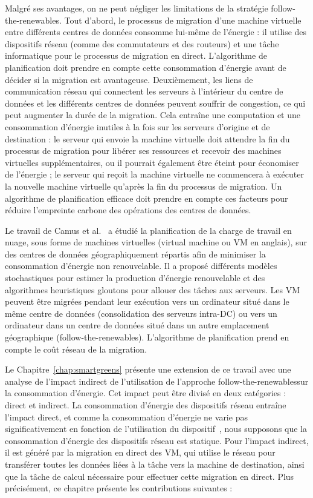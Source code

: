 Malgré ses avantages, on ne peut négliger les limitations de la stratégie follow-the-renewables. Tout d'abord, le processus de migration d'une machine virtuelle entre différents centres de données consomme lui-même de l'énergie : il utilise des dispositifs réseau (comme des commutateurs et des routeurs) et une tâche informatique pour le processus de migration en direct. L'algorithme de planification doit prendre en compte cette consommation d'énergie avant de décider si la migration est avantageuse. Deuxièmement, les liens de communication réseau qui connectent les serveurs à l'intérieur du centre de données et les différents centres de données peuvent souffrir de congestion, ce qui peut augmenter la durée de la migration. Cela entraîne une computation et une consommation d'énergie inutiles à la fois sur les serveurs d'origine et de destination : le serveur qui envoie la machine virtuelle doit attendre la fin du processus de migration pour libérer ses ressources et recevoir des machines virtuelles supplémentaires, ou il pourrait également être éteint pour économiser de l'énergie ; le serveur qui reçoit la machine virtuelle ne commencera à exécuter la nouvelle machine virtuelle qu'après la fin du processus de migration. Un algorithme de planification efficace doit prendre en compte ces facteurs pour réduire l'empreinte carbone des opérations des centres de données.

Le travail de Camus et al.~\citet{SAGITTA,NEMESIS} a étudié la planification de la charge de travail en nuage, sous forme de machines virtuelles (virtual machine ou VM en anglais), sur des centres de données géographiquement répartis afin de minimiser la consommation d'énergie non renouvelable. Il a proposé différents modèles stochastiques pour estimer la production d'énergie renouvelable et des algorithmes heuristiques gloutons pour allouer des tâches aux serveurs. Les VM peuvent être migrées pendant leur exécution vers un ordinateur situé dans le même centre de données (consolidation des serveurs intra-DC) ou vers un ordinateur dans un centre de données situé dans un autre emplacement géographique (\guillemotleft follow-the-renewables\guillemotright). L'algorithme de planification prend en compte le coût réseau de la migration.



Le Chapitre~\ref{chap:smartgreens} présente une extension de ce travail avec une analyse de l'impact indirect de l'utilisation de l'approche \guillemotleft follow-the-renewables\guillemotright sur la consommation d'énergie. Cet impact peut être divisé en deux catégories : direct et indirect. La consommation d'énergie des dispositifs réseau entraîne l'impact direct, et comme la consommation d'énergie ne varie pas significativement en fonction de l'utilisation du dispositif~\cite{energy_network_devices}, nous supposons que la consommation d'énergie des dispositifs réseau est statique. Pour l'impact indirect, il est généré par la migration en direct des VM, qui utilise le réseau pour transférer toutes les données liées à la tâche vers la machine de destination, ainsi que la tâche de calcul nécessaire pour effectuer cette migration en direct. Plus précisément, ce chapitre présente les contributions suivantes :

